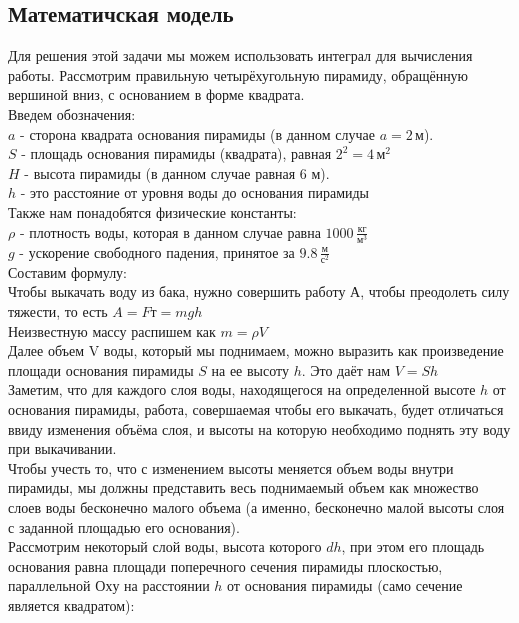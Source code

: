 \documentclass{article}
\begin{document}
    \subsection{Математичская модель}
Для решения этой задачи мы можем использовать интеграл для вычисления
работы. Рассмотрим правильную четырёхугольную пирамиду, обращённую
вершиной вниз, с основанием в форме квадрата.\\
Введем обозначения: \\
$a$ - сторона квадрата основания пирамиды (в данном случае $a=2 \, \text{м}$).\\
$S$ - площадь основания пирамиды (квадрата), равная $2^2 = 4 \, \text{м}^2$\\
$H$ - высота пирамиды (в данном случае равная 6 м).\\
$h$ - это расстояние от уровня воды до основания пирамиды\\
Также нам понадобятся физические константы:\\
$\rho$ - плотность воды, которая в данном случае равна $1000 \, \frac{\text{кг}}{\text{м}^3}$\\
$g$ - ускорение свободного падения, принятое за $9.8 \, \frac{\text{м}}{\text{с}^2}$ \\
Составим формулу:\\
Чтобы выкачать воду из бака, нужно совершить работу А, чтобы преодолеть
силу тяжести, то есть $A = Fт = mgh$\\
Неизвестную массу распишем как $m = \rho V$\\
Далее объем V воды, который мы поднимаем, можно выразить как
произведение площади основания пирамиды $S$ на ее высоту $h$. Это даёт нам
$V=Sh$\\
Заметим, что для каждого слоя воды, находящегося на определенной высоте
$h$ от основания пирамиды, работа, совершаемая чтобы его выкачать, будет
отличаться ввиду изменения объёма слоя, и высоты на которую необходимо
поднять эту воду при выкачивании.\\
Чтобы учесть то, что с изменением высоты меняется объем воды внутри
пирамиды, мы должны представить весь поднимаемый объем как множество
слоев воды бесконечно малого объема (а именно, бесконечно малой высоты
слоя с заданной площадью его основания).\\
Рассмотрим некоторый слой воды, высота которого $dh$, при этом его площадь
основания равна площади поперечного сечения пирамиды плоскостью,
параллельной $Оху$ на расстоянии $h$ от основания пирамиды (само сечение
является квадратом):\\
\end{document}
